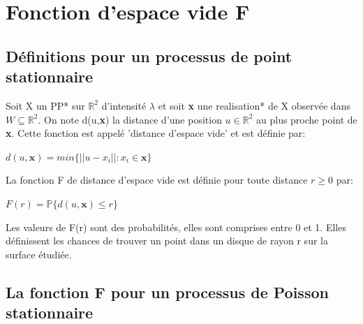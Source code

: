 \documentclass[stage2a]{tnreport}
\begin{document}


\section{Fonction d'espace vide F}

\subsection{Définitions pour un processus de point stationnaire}

Soit X un \gls{PP}* sur \begin{math}\mathbb{R}^2\end{math} d'intensité \begin{math}\lambda\end{math} et soit \textbf{x} une \gls{realisation}* de X observée dans \begin{math} W \subseteq \mathbb{R}^2\end{math}. On note d(u,\textbf{x}) la distance d'une position \begin{math} u \in \mathbb{R}^2 \end{math} au plus proche point de \textbf{x}. Cette fonction est appelé 'distance d'espace vide' et est définie par:
\begin{center}\begin{math} d(u,\textbf{x}) = min\{ ||u-x_i|| : x_i \in \textbf{x} \} \end{math}\end{center}

La fonction F de distance d'espace vide est définie pour toute distance \begin{math} r \geq 0 \end{math} par:
\begin{center}\begin{math} F(r) = \mathbb{P}\{ d(u,\textbf{x}) \leq r \} \end{math}\end{center}

Les valeurs de F(r) sont des probabilités, elles sont comprises entre 0 et 1. Elles définissent les chances de trouver un point dans un disque de rayon r sur la surface étudiée.\\


\subsection{La fonction F pour un processus de Poisson stationnaire}
\end{document}
